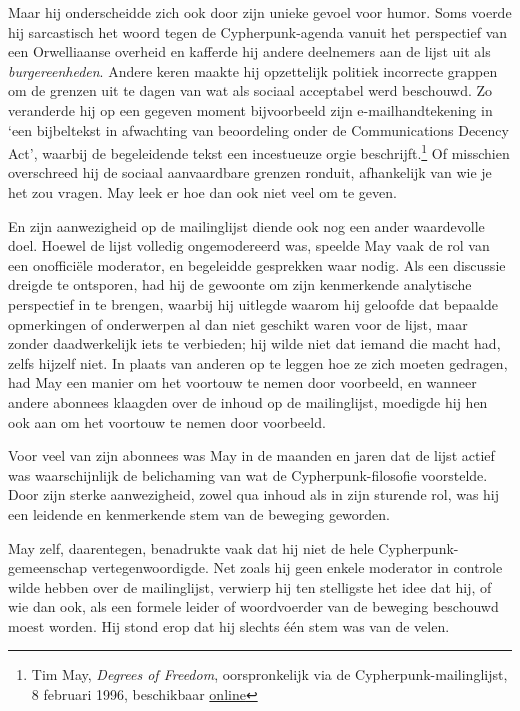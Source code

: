 \documentclass[
  a5paper,
  smalldemyvopaper,11pt,twoside,onecolumn,openright,extrafontsizes,
hidelinks]{memoir}
\begin{document}
Maar hij onderscheidde zich ook door zijn unieke gevoel voor humor. Soms
voerde hij sarcastisch het woord tegen de Cypherpunk-agenda vanuit het
perspectief van een Orwelliaanse overheid en kafferde hij andere
deelnemers aan de lijst uit als \emph{burgereenheden}. Andere keren
maakte hij opzettelijk politiek incorrecte grappen om de grenzen uit te
dagen van wat als sociaal acceptabel werd beschouwd. Zo veranderde hij
op een gegeven moment bijvoorbeeld zijn e-mailhandtekening in `een
bijbeltekst in afwachting van beoordeling onder de Communications
Decency Act', waarbij de begeleidende tekst een incestueuze orgie
beschrijft.\footnote{Tim May, \emph{Degrees of Freedom}, oorspronkelijk
  via de Cypherpunk-mailinglijst, 8 februari 1996, beschikbaar
  \href{https://cypherpunks.venona.com/date/1996/02/msg00637.html}{online}}
Of misschien overschreed hij de sociaal aanvaardbare grenzen ronduit,
afhankelijk van wie je het zou vragen. May leek er hoe dan ook niet veel
om te geven.

En zijn aanwezigheid op de mailinglijst diende ook nog een ander
waardevolle doel. Hoewel de lijst volledig ongemodereerd was, speelde
May vaak de rol van een onofficiële moderator, en begeleidde gesprekken
waar nodig. Als een discussie dreigde te ontsporen, had hij de gewoonte
om zijn kenmerkende analytische perspectief in te brengen, waarbij hij
uitlegde waarom hij geloofde dat bepaalde opmerkingen of onderwerpen al
dan niet geschikt waren voor de lijst, maar zonder daadwerkelijk iets te
verbieden; hij wilde niet dat iemand die macht had, zelfs hijzelf niet.
In plaats van anderen op te leggen hoe ze zich moeten gedragen, had May
een manier om het voortouw te nemen door voorbeeld, en wanneer andere
abonnees klaagden over de inhoud op de mailinglijst, moedigde hij hen
ook aan om het voortouw te nemen door voorbeeld.

Voor veel van zijn abonnees was May in de maanden en jaren dat de lijst
actief was waarschijnlijk de belichaming van wat de Cypherpunk-filosofie
voorstelde. Door zijn sterke aanwezigheid, zowel qua inhoud als in zijn
sturende rol, was hij een leidende en kenmerkende stem van de beweging
geworden.

May zelf, daarentegen, benadrukte vaak dat hij niet de hele
Cypherpunk-gemeenschap vertegenwoordigde. Net zoals hij geen enkele
moderator in controle wilde hebben over de mailinglijst, verwierp hij
ten stelligste het idee dat hij, of wie dan ook, als een formele leider
of woordvoerder van de beweging beschouwd moest worden. Hij stond erop
dat hij slechts één stem was van de velen.
\end{document}
